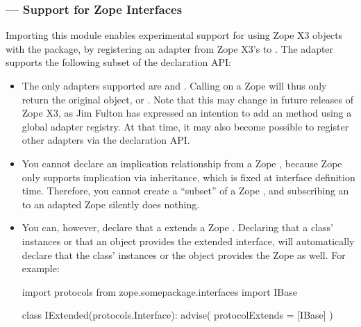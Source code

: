 \begin{verbatim%
}
\begin{verbatim%
}
\begin{verbatim%
}
\begin{verbatim%
}
\begin{verbatim%
}
\begin{verbatim%
}
\subsubsection{ --- Support for Zope Interfaces}

Importing this module enables experimental support for using Zope X3
 objects with the  package, by registering
an adapter from Zope X3's  to .  The
adapter supports the following subset of the declaration API:

\begin{itemize}

\item The only adapters supported are  and
.  Calling  on a Zope
 will thus only return the original object, or .
Note that this may change in future releases of Zope X3, as Jim Fulton has
expressed an intention to add an  method using a global
adapter registry.   At that time, it may also become possible to register
other adapters via the  declaration API.

\item You cannot declare an implication relationship from a Zope
, because Zope only supports implication via
inheritance, which is fixed at interface definition time.  Therefore, you cannot
create a ``subset'' of a Zope , and subscribing an
 to an adapted Zope 
silently does nothing.

\item You can, however, declare that a  extends a
Zope .  Declaring that a class' instances or that an object
provides the extended interface, will automatically declare that the class'
instances or the object provides the Zope  as well.  For
example:











\begin{verbatim%
}import protocols
from zope.somepackage.interfaces import IBase

class IExtended(protocols.Interface):
    advise(
        protocolExtends = [IBase]
    )


\end{verbatim%
}
\end{itemize}
\end{verbatim%
}
\end{verbatim%
}
\end{verbatim%
}
\end{verbatim%
}
\end{verbatim%
}
\end{verbatim%
}
